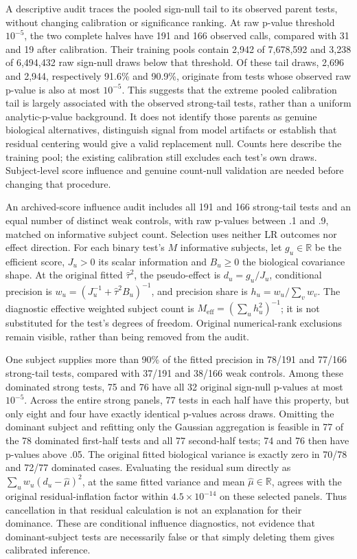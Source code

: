 \documentclass[11pt]{article}
\begin{document}
A descriptive audit traces the pooled sign-null tail to its observed parent tests, without changing calibration or significance ranking. At raw p-value threshold \(10^{-5}\), the two complete halves have 191 and 166 observed calls, compared with 31 and 19 after calibration. Their training pools contain 2,942 of 7,678,592 and 3,238 of 6,494,432 raw sign-null draws below that threshold. Of these tail draws, 2,696 and 2,944, respectively 91.6\% and 90.9\%, originate from tests whose observed raw p-value is also at most \(10^{-5}\). This suggests that the extreme pooled calibration tail is largely associated with the observed strong-tail tests, rather than a uniform analytic-p-value background. It does not identify those parents as genuine biological alternatives, distinguish signal from model artifacts or establish that residual centering would give a valid replacement null. Counts here describe the training pool; the existing calibration still excludes each test's own draws. Subject-level score influence and genuine count-null validation are needed before changing that procedure.

An archived-score influence audit includes all 191 and 166 strong-tail tests and an equal number of distinct weak controls, with raw p-values between .1 and .9, matched on informative subject count. Selection uses neither LR outcomes nor effect direction. For each binary test's \(M\) informative subjects, let \(g_u\in\mathbb R\) be the efficient score, \(J_u>0\) its scalar information and \(B_u\ge0\) the biological covariance shape. At the original fitted \(\widehat\tau^2\), the pseudo-effect is \(d_u=g_u/J_u\), conditional precision is \(w_u=(J_u^{-1}+\widehat\tau^2B_u)^{-1}\), and precision share is \(h_u=w_u/\sum_vw_v\). The diagnostic effective weighted subject count is \(M_{\mathrm{eff}}=(\sum_uh_u^2)^{-1}\); it is not substituted for the test's degrees of freedom. Original numerical-rank exclusions remain visible, rather than being removed from the audit.

One subject supplies more than 90\% of the fitted precision in 78/191 and 77/166 strong-tail tests, compared with 37/191 and 38/166 weak controls. Among these dominated strong tests, 75 and 76 have all 32 original sign-null p-values at most \(10^{-5}\). Across the entire strong panels, 77 tests in each half have this property, but only eight and four have exactly identical p-values across draws. Omitting the dominant subject and refitting only the Gaussian aggregation is feasible in 77 of the 78 dominated first-half tests and all 77 second-half tests; 74 and 76 then have p-values above .05. The original fitted biological variance is exactly zero in 70/78 and 72/77 dominated cases. Evaluating the residual sum directly as \(\sum_uw_u(d_u-\widehat\mu)^2\), at the same fitted variance and mean \(\widehat\mu\in\mathbb R\), agrees with the original residual-inflation factor within \(4.5\times10^{-14}\) on these selected panels. Thus cancellation in that residual calculation is not an explanation for their dominance. These are conditional influence diagnostics, not evidence that dominant-subject tests are necessarily false or that simply deleting them gives calibrated inference.
\end{document}
